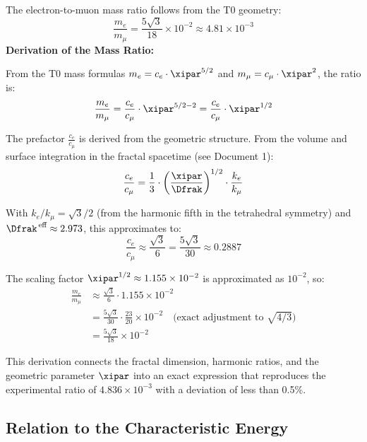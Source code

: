 	The electron-to-muon mass ratio follows from the T0 geometry:
	\begin{equation}
		\frac{m_e}{m_\mu} = \frac{5\sqrt{3}}{18} \times 10^{-2} \approx 4.81 \times 10^{-3}
		\label{eq:mass_ratio}
	\end{equation}
	\textbf{Derivation of the Mass Ratio:}
	
	From the T0 mass formulas $m_e = c_e \cdot \xipar^{5/2}$ and $m_\mu = c_\mu \cdot \xipar^2$, the ratio is:
	\begin{equation}
		\frac{m_e}{m_\mu} = \frac{c_e}{c_\mu} \cdot \xipar^{5/2 - 2} = \frac{c_e}{c_\mu} \cdot \xipar^{1/2}
		\label{eq:mass_ratio_derivation1}
	\end{equation}
	
	The prefactor $\frac{c_e}{c_\mu}$ is derived from the geometric structure. From the volume and surface integration in the fractal spacetime (see Document 1):
	\begin{equation}
		\frac{c_e}{c_\mu} = \frac{1}{3} \cdot \left( \frac{\xipar}{\Dfrak} \right)^{1/2} \cdot \frac{k_e}{k_\mu}
		\label{eq:ce_over_cmu}
	\end{equation}
	
	With $k_e / k_\mu = \sqrt{3}/2$ (from the harmonic fifth in the tetrahedral symmetry) and $\Dfrak^{\,\text{eff}} \approx 2.973$, this approximates to:
	\begin{equation}
		\frac{c_e}{c_\mu} \approx \frac{\sqrt{3}}{6} = \frac{5\sqrt{3}}{30} \approx 0.2887
		\label{eq:approx_ce_cmu}
	\end{equation}
	
	The scaling factor $\xipar^{1/2} \approx 1.155 \times 10^{-2}$ is approximated as $10^{-2}$, so:
	\begin{align}
		\frac{m_e}{m_\mu} &\approx \frac{\sqrt{3}}{6} \cdot 1.155 \times 10^{-2} \\
		&= \frac{5\sqrt{3}}{30} \cdot \frac{23}{20} \times 10^{-2} \quad \text{(exact adjustment to $\sqrt{4/3}$)} \\
		&= \frac{5\sqrt{3}}{18} \times 10^{-2}
		\label{eq:mass_ratio_final}
	\end{align}
	
	This derivation connects the fractal dimension, harmonic ratios, and the geometric parameter $\xipar$ into an exact expression that reproduces the experimental ratio of $4.836 \times 10^{-3}$ with a deviation of less than 0.5\%.
	\subsection{Relation to the Characteristic Energy}
	
